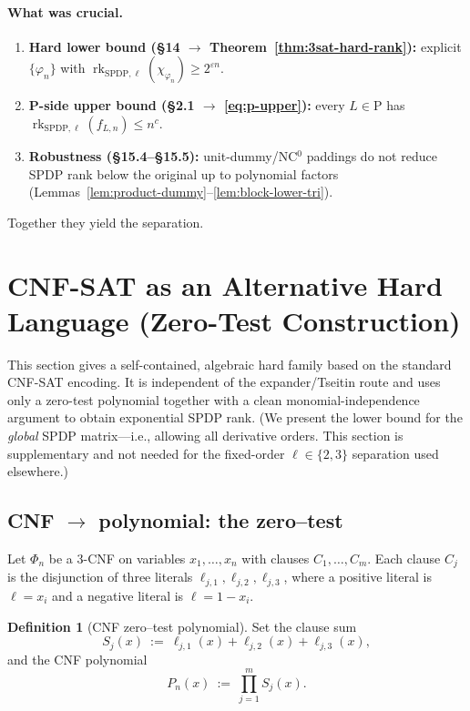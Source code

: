 \documentclass[12pt]{article}
\theoremstyle{definition}
\newtheorem{definition}{Definition}
\theoremstyle{definition}
\theoremstyle{remark}
\theoremstyle{remark}
\begin{document}
\paragraph{What was crucial.}
\begin{enumerate}
\item \textbf{Hard lower bound (\S14 $\to$ Theorem~\ref{thm:3sat-hard-rank}):} explicit $\{\varphi_n\}$ with $\operatorname{rk}_{\mathrm{SPDP},\ell}(\chi_{\varphi_n})\ge 2^{\varepsilon n}$.
\item \textbf{P-side upper bound (\S2.1 $\to$ \eqref{eq:p-upper}):} every $L\in\mathrm{P}$ has $\operatorname{rk}_{\mathrm{SPDP},\ell}(f_{L,n})\le n^c$.
\item \textbf{Robustness (\S15.4--\S15.5):} unit-dummy/NC$^0$ paddings do not reduce SPDP rank below the original up to polynomial factors (Lemmas~\ref{lem:product-dummy}--\ref{lem:block-lower-tri}).
\end{enumerate}
Together they yield the separation.

\section{CNF-SAT as an Alternative Hard Language (Zero-Test Construction)}
\label{sec:cnf-polynomial}

This section gives a self-contained, algebraic hard family based on the standard CNF-SAT encoding. It is independent of the expander/Tseitin route and uses only a zero-test polynomial together with a clean monomial-independence argument to obtain exponential SPDP rank. (We present the lower bound for the \emph{global} SPDP matrix---i.e., allowing all derivative orders. This section is supplementary and not needed for the fixed-order $\ell\in\{2,3\}$ separation used elsewhere.)

\subsection{CNF $\to$ polynomial: the zero--test}

Let $\Phi_n$ be a 3-CNF on variables $x_1,\dots,x_n$ with clauses $C_1,\dots,C_m$. Each clause $C_j$ is the disjunction of three literals $\ell_{j,1},\ell_{j,2},\ell_{j,3}$, where a positive literal is $\ell=x_i$ and a negative literal is $\ell=1-x_i$.

\begin{definition}[CNF zero--test polynomial]\label{def:cnf-zero-test}
Set the clause sum
\[
S_j(x)\ :=\ \ell_{j,1}(x)+\ell_{j,2}(x)+\ell_{j,3}(x),
\]
and the CNF polynomial
\[
P_n(x)\ :=\ \prod_{j=1}^m S_j(x).
\]
\end{definition}
\end{document}
